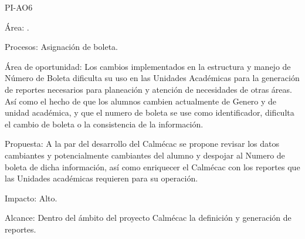 \begin{AreaOportunidad}{PI-AO6}
	\item[Área:] .
	\item[Procesos:] Asignación de boleta.
	\item[Área de oportunidad:] Los cambios implementados en la estructura y manejo de Número de Boleta dificulta su uso en las Unidades Académicas para la generación de reportes necesarios para planeación y atención de necesidades de otras áreas. Así como el hecho de que los alumnos cambien actualmente de Genero y de unidad académica, y que el numero de boleta se use como identificador, dificulta el cambio de boleta o la consistencia de la información. 
	\item[Propuesta:] A la par del desarrollo del Calmécac se propone revisar los datos cambiantes y potencialmente cambiantes del alumno y despojar al Numero de boleta de dicha información, así como enriquecer el Calmécac con los reportes que las Unidades académicas requieren para su operación. 
	\item[Impacto:] Alto.
	\item[Alcance:] Dentro del ámbito del proyecto Calmécac la definición y generación de reportes.
\end{AreaOportunidad}

